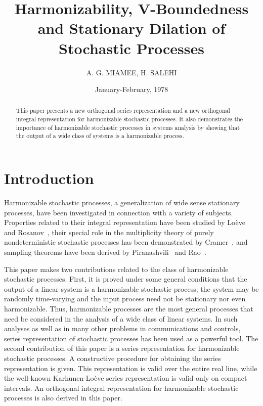 \documentclass{article}
\begin{document}
\title{Harmonizability, V-Boundedness and Stationary Dilation of Stochastic
Processes}

\author{A. G. MIAMEE, H. SALEHI}

\date{January-February, 1978}

\maketitle

\begin{abstract}
  This paper presents a new orthogonal series representation and a new
  orthogonal integral representation for harmonizable stochastic processes. It
  also demonstrates the importance of harmonizable stochastic processes in
  systems analysis by showing that the output of a wide class of systems is a
  harmonizable process.
\end{abstract}

\section{Introduction}\label{sec:intro}

Harmonizable stochastic processes, a generalization of wide sense stationary
processes, have been investigated in connection with a variety of subjects.
Properties related to their integral representation have been studied by
Lo{\`e}ve~{\cite{loeve1963}} and Rosanov~{\cite{rosanov1959}}, their special
role in the multiplicity theory of purely nondeterministic stochastic
processes has been demonstrated by Cramer~{\cite{cramer1964}}, and sampling
theorems have been derived by Piranashvili~{\cite{piranashvili1967}} and
Rao~{\cite{rao1967}}.

This paper makes two contributions related to the class of harmonizable
stochastic processes. First, it is proved under some general conditions that
the output of a linear system is a harmonizable stochastic process; the system
may be randomly time-varying and the input process need not be stationary nor
even harmonizable. Thus, harmonizable processes are the most general processes
that need be considered in the analysis of a wide class of linear systems. In
such analyses as well as in many other problems in communications and
controls, series representation of stochastic processes has been used as a
powerful tool. The second contribution of this paper is a series
representation for harmonizable stochastic processes. A constructive procedure
for obtaining the series representation is given. This representation is valid
over the entire real line, while the well-known Karhunen-Lo{\`e}ve series
representation is valid only on compact intervals. An orthogonal integral
representation for harmonizable stochastic processes is also derived in this
paper.
\end{document}
